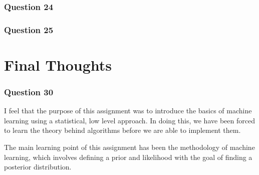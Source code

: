 \documentclass[10pt, a4paper, twocolumn]{article} %
\begin{document}
\subsubsection*{Question 24}

\subsubsection*{Question 25}

\section{Final Thoughts}
\subsubsection*{Question 30}
I feel that the purpose of this assignment was to introduce the basics of machine learning using a statistical, low level approach. In doing this, we have been forced to learn the theory behind algorithms before we are able to implement them. 
\par
The main learning point of this assignment has been the methodology of machine learning, which involves defining a prior and likelihood with the goal of finding a posterior distribution. 


\printbibliography[title={Bibliography}] %

\end{document}

